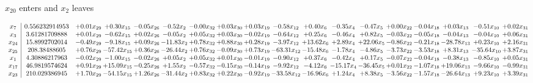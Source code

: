 \documentclass[9pt]{article}
\begin{document}
 $ x_{20} $ enters and $ x_{2} $ leaves 

 \[\begin{array}{c| c c@{\hskip 2pt} c@{\hskip 2pt} c@{\hskip 2pt} c@{\hskip 2pt} c@{\hskip 2pt} c@{\hskip 2pt} c@{\hskip 2pt} c@{\hskip 2pt} c@{\hskip 2pt} c@{\hskip 2pt} c@{\hskip 2pt} c@{\hskip 2pt} c@{\hskip 2pt} c@{\hskip 2pt} c@{\hskip 2pt} c@{\hskip 2pt} }
 x_{7}   &  0.556232914953 & +  0.01 x_{29} & +  0.30 x_{15} & -0.05 x_{26} & -0.52 x_{2} & -0.00 x_{32} & +  0.03 x_{30} & +  0.03 x_{19} & -0.58 x_{12} & +  0.40 x_{6} & -0.35 x_{4} & -0.47 x_{5} & +  0.00 x_{22} & -0.04 x_{18} & +  0.03 x_{13} & -0.51 x_{10} & +  0.02 x_{31}\\
 x_{3}   &  3.61281709888 & +  0.01 x_{29} & -0.62 x_{15} & +  0.02 x_{26} & -0.05 x_{2} & +  0.05 x_{32} & +  0.03 x_{30} & -0.02 x_{19} & -0.64 x_{12} & +  0.25 x_{6} & -0.46 x_{4} & +  0.82 x_{5} & -0.03 x_{22} & -0.05 x_{18} & -0.04 x_{13} & -0.04 x_{10} & +  0.06 x_{31}\\
 x_{24}   &  15.8992702014 & -0.49 x_{29} & -9.18 x_{15} & +  0.09 x_{26} & -11.83 x_{2} & +  0.78 x_{32} & +  0.88 x_{30} & +  0.28 x_{19} & -3.97 x_{12} & + 13.62 x_{6} & +  2.89 x_{4} & + 22.06 x_{5} & -0.86 x_{22} & -0.21 x_{18} & -28.78 x_{13} & +  0.23 x_{10} & +  2.16 x_{31}\\
 x_{25}   &  208.38488605 & +  0.76 x_{29} & -57.42 x_{15} & +  0.36 x_{26} & -26.44 x_{2} & +  0.76 x_{32} & -0.09 x_{30} & +  0.73 x_{19} & -63.31 x_{12} & -15.48 x_{6} & -1.78 x_{4} & -4.86 x_{5} & -3.73 x_{22} & -3.53 x_{18} & +  8.31 x_{13} & -35.64 x_{10} & +  3.87 x_{31}\\
 x_{1}   &  4.30886217963 & -0.02 x_{29} & -1.00 x_{15} & -0.02 x_{26} & +  0.05 x_{2} & +  0.05 x_{32} & +  0.01 x_{30} & -0.01 x_{19} & -0.90 x_{12} & +  0.37 x_{6} & -0.42 x_{4} & +  0.17 x_{5} & -0.07 x_{22} & -0.04 x_{18} & -0.38 x_{13} & -0.85 x_{10} & +  0.05 x_{31}\\
 x_{17}   &  46.9819574624 & +  0.91 x_{29} & + 15.09 x_{15} & -0.25 x_{26} & +  1.55 x_{2} & -0.57 x_{32} & -0.15 x_{30} & -0.14 x_{19} & -9.92 x_{12} & -4.12 x_{6} & -15.17 x_{4} & -36.45 x_{5} & +  0.01 x_{22} & -1.07 x_{18} & + 19.06 x_{13} & -9.66 x_{10} & -0.99 x_{31}\\
 x_{23}   &  210.029386945 & +  1.70 x_{29} & -54.15 x_{15} & +  1.26 x_{26} & -31.44 x_{2} & +  0.83 x_{32} & +  0.22 x_{30} & -0.92 x_{19} & -33.58 x_{12} & -16.96 x_{6} & +  1.24 x_{4} & +  8.38 x_{5} & -3.56 x_{22} & -1.57 x_{18} & -26.64 x_{13} & +  9.23 x_{10} & +  3.39 x_{31}\\

\end{array}\]
\end{document}

